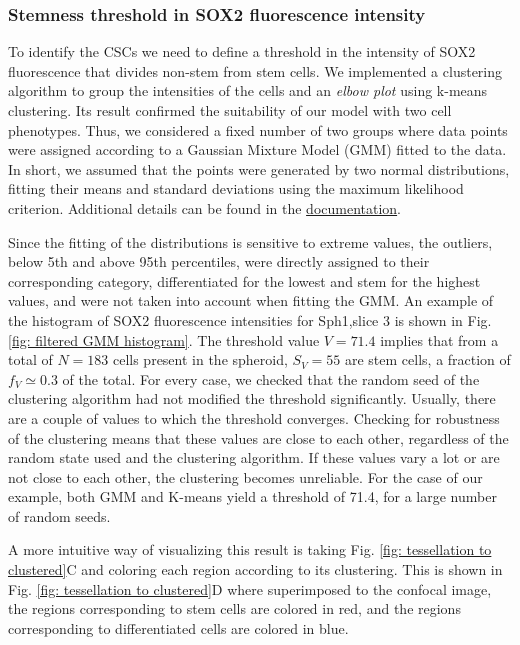 \documentclass[fleqn,10pt]{wlscirep}
\begin{document}
\subsubsection*{Stemness threshold in SOX2 fluorescence intensity}

To identify the CSCs we need to define a threshold in the intensity of SOX2 fluorescence that divides non-stem from stem cells. We implemented a clustering algorithm to group the intensities of the cells and an \emph{elbow plot} using k-means clustering. Its result confirmed the suitability of our model with two cell phenotypes. Thus, we considered a fixed number of two groups where data points were assigned according to a Gaussian Mixture Model (GMM) fitted to the data. In short, we assumed that the points were generated by two normal distributions, fitting their means and standard deviations using the maximum likelihood criterion. Additional details can be found in the  \href{https://scikit-learn.org/stable/modules/generated/sklearn.mixture.GaussianMixture.html}{documentation}.

Since the fitting of the distributions is sensitive to extreme values, the outliers, below 5th and above 95th percentiles, were directly assigned to their corresponding category, differentiated for the lowest and stem for the highest values, and were not taken into account when fitting the GMM. An example of the histogram of SOX2 fluorescence intensities for \textsf{Sph1,slice 3} is shown in Fig. \ref{fig: filtered GMM histogram}. The threshold value $V=71.4$ implies that from a total of $N=183$ cells present in the spheroid, $S_V=55$ are stem cells, a fraction of $f_V\simeq0.3$ of the total.
For every case, we checked that the random seed of the clustering algorithm had not modified the threshold significantly. Usually, there are a couple of values to which the threshold converges. Checking for robustness of the clustering means that these values are close to each other, regardless of the random state used and the clustering algorithm. If these values vary a lot or are not close to each other, the clustering becomes unreliable. For the case of our example, both GMM and K-means yield a threshold of 71.4, for a large number of random seeds.

A more intuitive way of visualizing this result is taking Fig. \ref{fig: tessellation to clustered}C and coloring each region according to its clustering. This is shown in Fig. \ref{fig: tessellation to clustered}D where superimposed to the confocal image, the regions corresponding to stem cells are colored in red, and the regions corresponding to differentiated cells are colored in blue. 
\end{document}
